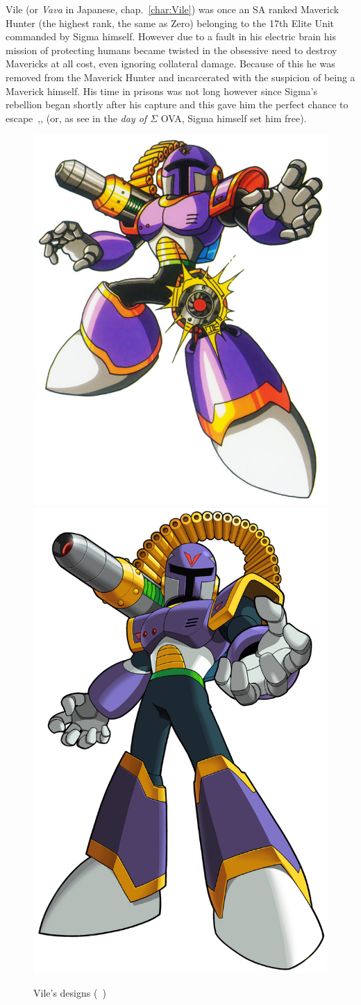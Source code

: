Vile (or \textit{Vava} in Japanese, chap.~\ref{char:Vile}) was once an SA ranked Maverick Hunter (the highest rank, the same as Zero) belonging to the 17th Elite Unit commanded by Sigma himself. However due to a fault in his electric brain his mission of protecting humans became twisted in the obsessive need to destroy Mavericks at all cost, even ignoring collateral damage. Because of this he was removed from the Maverick Hunter and incarcerated with the suspicion of being a Maverick himself. His time in prisons was not long however since Sigma's rebellion began shortly after his capture and this gave him the perfect chance to escape~\cite{Xcoll1:Manual_X1},\cite{MHX:manual},\cite{wayback:X_resources} (or, as see in the \textit{day of $\Sigma$} OVA, Sigma himself set him free). 
\begin{figure}[htp]
	\centering
	\includegraphics[width=0.4\linewidth]{figures/X1/Sigma_stages/Vile.jpg}
	\includegraphics[width=0.35\linewidth]{figures/X1/Sigma_stages/MhxVile.png}
	\caption{Vile's designs (~\cite{book:MMX_Complete_art})}
\end{figure}
